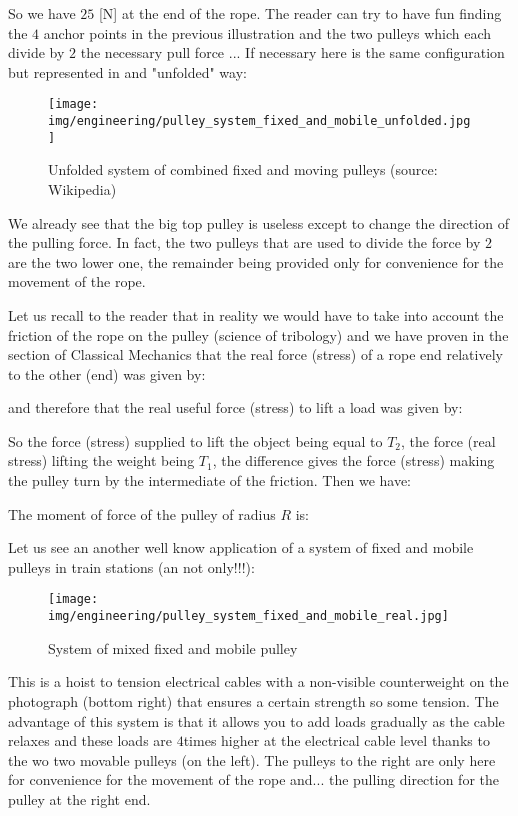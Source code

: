 	So we have $25$ [N] at the end of the rope. The reader can try to have fun finding the $4$ anchor points in the previous illustration and the two pulleys which each divide by $2$ the necessary pull force ... If necessary here is the same configuration but represented in and "unfolded" way:
	\begin{figure}[H]
		\centering
		\texttt{[image: img/engineering/pulley\_system\_fixed\_and\_mobile\_unfolded.jpg]}
		\caption[Unfolded system of combined fixed and moving pulleys]{Unfolded system of combined fixed and moving pulleys (source: Wikipedia)}
	\end{figure}
	We already see that the big top pulley is useless except to change the direction of the pulling force. In fact, the two pulleys that are used to divide the force by $2$ are the two lower one, the remainder being provided only for convenience for the movement of the rope.
	
	Let us recall to the reader that in reality we would have to take into account the friction of the rope on the pulley (science of tribology) and we have proven in the section of Classical Mechanics that the real force (stress) of a rope end relatively to the other (end) was given by:
	
	and therefore that the real useful force (stress) to lift a load was given by:
	
	So the force (stress) supplied to lift the object being equal to $T_2$, the force (real stress) lifting the weight being $T_1$, the difference gives the force (stress) making the pulley turn by the intermediate of the friction. Then we have:
	
	The moment of force of the pulley of radius $R$ is:
	
	Let us see an another well know application of a system of fixed and mobile pulleys in train stations (an not only!!!):
	\begin{figure}[H]
		\centering
		\texttt{[image: img/engineering/pulley\_system\_fixed\_and\_mobile\_real.jpg]}
		\caption{System of mixed fixed and mobile pulley}
	\end{figure}
	This is a hoist to tension electrical cables with a non-visible counterweight on the photograph (bottom right) that ensures a certain strength so some tension. The advantage of this system is that it allows you to add loads gradually as the cable relaxes and these loads are $4$times higher at the electrical cable level thanks to the wo two movable pulleys (on the left). The pulleys to the right are only here for convenience for the movement of the rope and... the pulling direction for the pulley at the right end.
	
